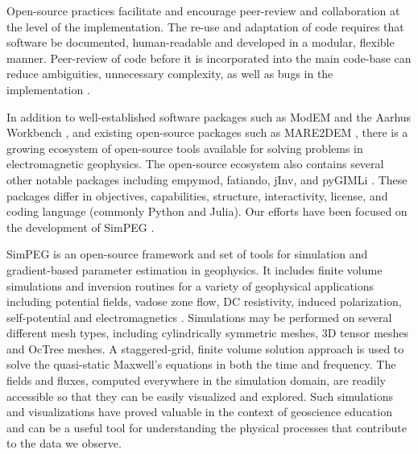 \documentclass[paper]{geophysics}
\begin{document}
Open-source practices facilitate and encourage peer-review and collaboration at the level of the implementation. The re-use and adaptation of code requires that software be documented, human-readable and developed in a modular, flexible manner. Peer-review of code before it is incorporated into the main code-base can reduce ambiguities, unnecessary complexity, as well as bugs in the implementation \citep{Wilson2014}.

In addition to well-established software packages such as ModEM and the Aarhus Workbench \citep{Kelbert2014, Auken2015}, and existing open-source packages such as MARE2DEM \citep{Key2011}, there is a growing ecosystem of open-source tools available for solving problems in electromagnetic geophysics. The open-source ecosystem also contains several other notable packages including empymod, fatiando, jInv, and pyGIMLi \citep{Werthmuller2017, Uieda2013, Ruthotto2017, Rucker2017}. These packages differ in objectives, capabilities, structure, interactivity, license, and coding language (commonly Python and Julia). Our efforts have been focused on the development of SimPEG \citep{Cockett2015, Heagy2017}.

SimPEG is an open-source framework and set of tools for simulation and gradient-based parameter estimation in geophysics. It includes finite volume simulations and inversion routines for a variety of geophysical applications including potential fields, vadose zone flow, DC resistivity, induced polarization, self-potential and electromagnetics \citep{Cockett2015, kang2016, Heagy2017, Miller2017, Cockett2018, Miller2018, Witter2018}. Simulations may be performed on several different mesh types, including cylindrically symmetric meshes, 3D tensor meshes and OcTree meshes. A staggered-grid, finite volume solution approach is used to solve the quasi-static Maxwell’s equations in both the time and frequency. The fields and fluxes, computed everywhere in the simulation domain, are readily accessible so that they can be easily visualized and explored. Such simulations and visualizations have proved valuable in the context of geoscience education \citep{Oldenburg2017} and can be a useful tool for understanding the physical processes that contribute to the data we observe.
\end{document}
